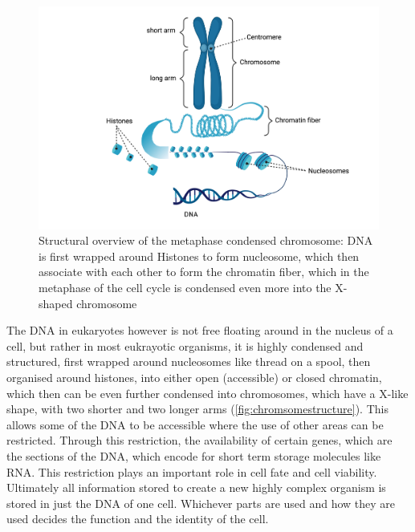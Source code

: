 \begin{figure}[!ht]
\centering
\includegraphics[width=0.9\linewidth]{Figures/ChromosomeStructure.png}
\caption[Overview Chromosome structure]{Structural overview of the metaphase condensed chromosome: DNA is first wrapped around Histones to form nucleosome, which then associate with each other to form the chromatin fiber, which in the metaphase of the cell cycle is condensed even more into the X-shaped chromosome}\label{fig:chromsomestructure}
\end{figure}

The DNA in eukaryotes however is not free floating around in the nucleus of a cell, but rather in most eukrayotic organisms, it is highly condensed and structured, first wrapped around nucleosomes like thread on a spool, then organised around histones, into either open (accessible) or closed chromatin, which then can be even further condensed into chromosomes, which have a X-like shape, with two shorter and two longer arms (\autoref{fig:chromsomestructure}). This allows some of the DNA to be accessible where the use of other areas can be restricted\cite{Hammond2017}. Through this restriction, the availability of certain genes, which are the sections of the DNA, which encode for short term storage molecules like RNA. This restriction plays an important role in cell fate and cell viability. Ultimately all information stored to create a new highly complex organism is stored in just the DNA of one cell. Whichever parts are used and how they are used decides the function and the identity of the cell\cite{Bonev2016}. 



